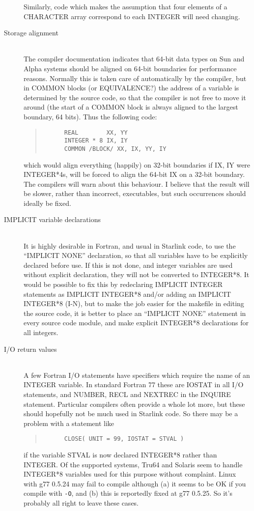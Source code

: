 \documentclass[twoside,11pt]{article}
\newcommand{\html}[1]{}
\renewcommand{\_}{\texttt{\symbol{95}}}
\newcommand{\ditem}[1]{\item[#1]\mbox{}\\}
\newenvironment{squote}{\begin{quote}\begin{small}}{\end{small}\end{quote}}
\begin{document}
\begin{description}
Similarly, code which makes the assumption that four elements of
a CHARACTER array correspond to each INTEGER will need changing.
%
\ditem{Storage alignment}
The compiler documentation indicates that
64-bit data types on Sun and Alpha systems should be aligned on
64-bit boundaries for performance reasons.
Normally this is taken care of automatically by the compiler,
but in COMMON blocks (or EQUIVALENCE?) the address of a
variable is determined by the source code, so that the compiler
is not free to move it around (the start of a COMMON block is
always aligned to the largest boundary, 64 bits).
Thus the following code:
\begin{squote}
\begin{verbatim}
      REAL        XX, YY
      INTEGER * 8 IX, IY
      COMMON /BLOCK/ XX, IX, YY, IY
\end{verbatim}
\end{squote}
which would align everything (happily) on 32-bit boundaries if IX, IY
were INTEGER*4s, will be forced to align the 64-bit IX on a 32-bit
boundary.
The compilers will warn about this behaviour.
I believe that the result will be slower, rather than incorrect,
executables,
but such occurrences should ideally be fixed.
\html{\begin{squote}\end{squote}}
%
\ditem{IMPLICIT variable declarations}
It is highly desirable in Fortran, and usual in Starlink code, to use
the ``IMPLICIT NONE'' declaration, so that all variables have to be
explicitly declared before use.
If this is not done, and integer variables are used without explicit
declaration, they will not be converted to INTEGER*8.
It would be possible to fix this by redeclaring IMPLICIT INTEGER
statements as IMPLICIT INTEGER*8 and/or adding an IMPLICIT INTEGER*8 (I-N),
but to make the job easier for
the makefile in editing the source code, it is better to place
an ``IMPLICIT NONE'' statement in every source code module, and
make explicit INTEGER*8 declarations for all integers.
\html{\begin{squote}\end{squote}}
%
\ditem{I/O return values}
A few Fortran I/O statements have specifiers which require the name
of an INTEGER variable.  In standard Fortran 77 these are
IOSTAT in all I/O statements, and
NUMBER, RECL and NEXTREC in the INQUIRE statement.
Particular compilers often provide a whole lot more, but these
should hopefully not be much used in Starlink code.
So there may be a problem with a statement like
\begin{squote}
\begin{verbatim}
      CLOSE( UNIT = 99, IOSTAT = STVAL )
\end{verbatim}
\end{squote}
if the variable STVAL is now declared INTEGER*8 rather than INTEGER.
Of the supported systems, Tru64 and Solaris seem to handle
INTEGER*8 variables used for this purpose without complaint.
Linux with g77 0.5.24 may fail to compile although (a) it seems to
be OK if you compile with {\tt -O}, and (b) this is reportedly
fixed at g77 0.5.25.  So it's probably all right to leave these cases.
%
\end{description}
\end{document}
